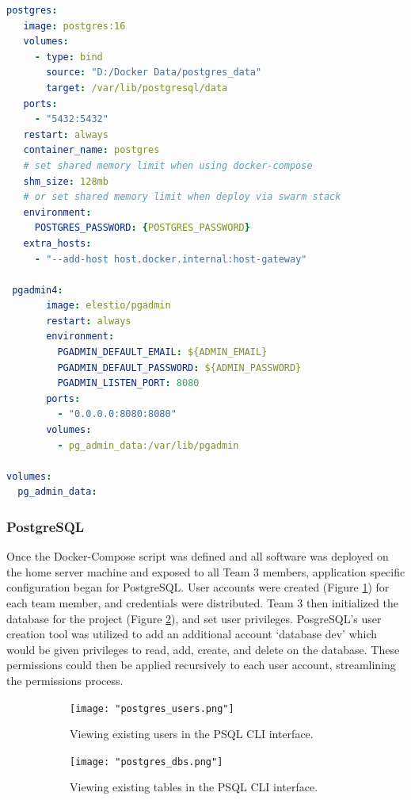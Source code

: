 \documentclass{article}
\begin{document}
\begin{lstlisting}[language=yaml]
 postgres:
   image: postgres:16
   volumes:
     - type: bind
       source: "D:/Docker Data/postgres_data"
       target: /var/lib/postgresql/data
   ports:
     - "5432:5432"
   restart: always
   container_name: postgres
   # set shared memory limit when using docker-compose
   shm_size: 128mb
   # or set shared memory limit when deploy via swarm stack
   environment:
     POSTGRES_PASSWORD: {POSTGRES_PASSWORD}
   extra_hosts:
     - "--add-host host.docker.internal:host-gateway"

 pgadmin4:
       image: elestio/pgadmin
       restart: always
       environment:
         PGADMIN_DEFAULT_EMAIL: ${ADMIN_EMAIL}
         PGADMIN_DEFAULT_PASSWORD: ${ADMIN_PASSWORD}
         PGADMIN_LISTEN_PORT: 8080
       ports:
         - "0.0.0.0:8080:8080"
       volumes:
         - pg_admin_data:/var/lib/pgadmin

volumes: 
  pg_admin_data:
\end{lstlisting}
\subsubsection{PostgreSQL}
Once the Docker-Compose script was defined and all software was deployed on the home server machine and exposed to all Team 3 members, 
application specific configuration began for PostgreSQL. User accounts were created (Figure \ref{fig:psql_users}) for each team member,
and credentials were distributed. Team 3 then initialized the database for the project (Figure \ref{fig:psql_dbs}), and set 
user privileges. PosgreSQL's user creation tool was utilized to add an additional account `database dev' which would be given privileges
to read, add, create, and delete on the database. These permissions could then be applied recursively to each user account, streamlining
the permissions process. 

\begin{figure}[h!]
    \centering
    \begin{subfigure}[b]{\textwidth}
        \centering
        \texttt{[image: "postgres\_users.png"]}
        \caption{Viewing existing users in the PSQL CLI interface.}
        \label{fig:psql_users}
    \end{subfigure}
    \begin{subfigure}[b]{\textwidth}
        \centering
        \texttt{[image: "postgres\_dbs.png"]}
        \caption{Viewing existing tables in the PSQL CLI interface.}
        \label{fig:psql_dbs}
    \end{subfigure}
    \caption{}
    \label{fig:posgres_cli}
\end{figure}
\FloatBarrier
\end{document}
